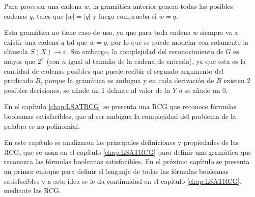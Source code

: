 \documentclass[12pt]{article}
\begin{document}
Para procesar una cadena $w$, la gramática anterior genera todas las posibles cadenas $q$, tales que $|w|=|q|$ y luego comprueba si $w = q$.

Esta gramática no tiene caso de uso, ya que para toda cadena $w$ siempre va a existir una cadena $q$ tal que $w=q$, 
por lo que se puede modelar con solamente la cláusula $S(X)\to \varepsilon$. Sin embargo, la complejidad del 
reconocimiento de $G$ es mayor que $2^n$ (con $n$ igual al tamaño de la cadena de entrada), ya que esta es la 
cantidad de cadenas posibles que puede recibir el segundo argumento del predicado $B$, porque la gramática es 
ambigua y en cada derivación de $B$ existen 2 posibles decisiones, se añade un 1 delante al valor de la $Y$ o 
se añade un $0$.

En el capítulo \ref{chap:LSATRCG} se presenta una RCG que reconoce fórmulas booleanas satisfacibles, que al ser ambigua la complejidad del problema de la palabra es no polinomial.

En este capítulo se analizaron las principales definiciones y propiedades de las RCG, que se usan en el capítulo \ref{chap:LSATRCG} para definir una gramática que reconozca las fórmulas booleanas satisfacibles.  En el próximo capítulo se presenta un primer enfoque para definir el lenguaje de todas las fórmulas booleanas satisfacibles y a esta idea se le da continuidad en el capítulo \ref{chap:LSATRCG}, mediante las RCG.
\end{document}
